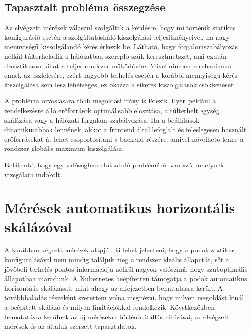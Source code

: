 \subsection{Tapasztalt probléma összegzése}
Az elvégzett mérések válaszul szolgáltak a kérdésre, hogy mi történik statikus konfiguráció esetén a szolgáltatásháló kiszolgálási teljesítményeivel, ha nagy mennyiségű kiszolgálandó kérés érkezik be.
Látható, hogy forgalomszabályozás nélkül túlterhelődik a hálózatban szereplő szűk keresztmetszet, ami ezután drasztikusan kihat a teljes rendszer működésére.
Mivel nincsen mechanizmus ennek az észlelésére, ezért nagyobb terhelés esetén a korábbi mennyiségű kérés kiszolgálása sem lesz lehetséges, ez okozza a sikeres kiszolgálások csökkenését.

A probléma orvoslására több megoldási irány is létezik. 
Ilyen például a rendelkezésre álló erőforrások optimálisabb elosztása, a túlterhelt egység skálázása vagy a hálózati forgalom szabályozása.
Ha a beállítások dinamikusabbak lennének, akkor a frontend által lefoglalt és feleslegesen használt erőforrásokat át lehet csoportosítani a backend részére, amivel növelhető lenne a rendszer globális maximum kiszolgálása.

Belátható, hogy egy valóságban előforduló problémáról van szó, amelynek vizsgálata indokolt.

\section{Mérések automatikus horizontális skálázóval}

A korábban végzett mérések alapján ki lehet jelenteni, hogy a podok statikus konfigurálásával nem mindig találjuk meg a rendszer ideális állapotát,  sőt a jövőbeli terhelés pontos információja nélkül nagyon valószínű, hogy szuboptimális állapotban maradunk.
A Kubernetes beépítetten támogatja a podok automatikus horizontális skálázását, mint ahogy az  alfejezetben bemutatásra került.
A továbbhaladás részeként szerettem volna megnézni, hogy milyen megoldást kínál a beépített skálázó és milyen limitációkkal rendelkezik.
Következőkben bemutatásra kerülnek az új mérésekre történő átállás kihívásai, az elvégzett mérések és az általuk szerzett tapasztalatok.

